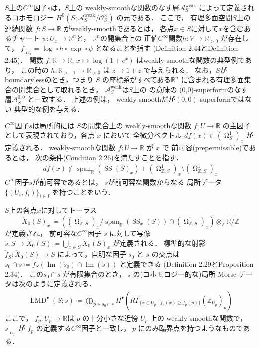 \documentclass[uplatex,dvipdfmx,12pt]{jsarticle}
\numberwithin{equation}{section}
\theoremstyle{definition}
\newcommand{\deq}{\coloneqq}
\newcommand{\opn}[1]{\operatorname{#1}}
\DeclareMathOperator{\tform}{\Omega}
\begin{document}
$S$上の$C^{\infty}$因子$s$は，$S$上の
weakly-smoothな関数のなす層$\mathcal{A}^{\mathrm{weak}}_S$
によって定義されるコホモロジー
$H^{0}(S;\mathcal{A}^{\mathrm{weak}}_S/\mathcal{O}^{\times}_S)$
の元である．
ここで，
有理多面空間$S$上の連続関数
$f\colon S\to \mathbb{R}$
がweakly-smoothであるとは，
各点$x\in S$に対して$x$を含むあるチャート
$\psi \colon U_x\to \underline{\mathbb{R}}^{n}$と，
$\mathbb{R}^{n}$の開集合上の
正値$C^{\infty}$関数$h\colon V\to \mathbb{R}_{>0}$
が存在して，
$f|_{U_x}=\opn{log}\circ h\circ \opn{exp}\circ \psi$
となることを指す
(Definition 2.44とDefinition 2.45)．
関数
$
f\colon \underline{\mathbb{R}}\to \mathbb{R}
$;
$
x\mapsto \opn{log}(1+e^{x})
$
はweakly-smoothな関数の典型例であり，
この時の
$
h \colon \mathbb{R}_{>-1} \to \mathbb{R}_{>0}
$
は
$
z \mapsto 1+z
$
で与えられる．
なお，$S$がboundarylessのとき，つまり
$S$ の座標系がすべてある$\mathbb{R}^{n}$ 
に含まれる有理多面集合の開集合として取れるとき，
$\mathcal{A}^{\mathrm{weak}}_S$は$S$上の
\cite{MR3903579}の意味の
(0,0)-superformのなす
層$\mathcal{A}^{0,0}_S$
と一致する．
上述の例は，
weakly-smoothだが$(0,0)$-superformではない
典型的な例を与える．

$C^{\infty}$因子$s$は局所的には
$S$の開集合上の 
weakly-smoothな関数 $f\colon U\to \mathbb{R}$
の主因子として表現されており，各点 $x$ において
全微分ベクトル $df(x)\in(\tform_{S}^{1})_x$ 
が定義される．
weakly-smoothな関数
$f\colon U \to \mathbb{R}$ が $x$ で
前可容(prepermissible)であるとは，
次の条件(Condition 2.26)を満たすことを指す．
\begin{align}
df(x)\notin\opn{span}_{\mathbb{R}}(\opn{SS}(S)_x)+
(\tform_{\mathbb{Z},S}^{1})_x 
\setminus (\tform_{\mathbb{Z},S}^{1})_x
\end{align}
$C^{\infty}$因子$s$が前可容であるとは，
$s$が前可容な関数からなる
局所データ$\{(U_i,f_i)\}_{i\in I}$
を持つことをいう．

$S$上の各点$x$に対してトーラス
\begin{equation}
\check{X}_0(S)_x\deq ((\tform^{1}_{\mathbb{Z},S})_x/
\opn{span}_{\mathbb{R}}(\opn{SS}_x(S))\cap 
(\tform^{1}_{\mathbb{Z},S})_x)\otimes_{\mathbb{Z}}
\mathbb{R}/\mathbb{Z}
\end{equation}
が定義され，
前可容な$C^{\infty}$因子 $s$ に対して写像
$\check{s}\colon S\to \check{X}_0(S)\deq 
\bigcup_{x\in S} \check{X}_0(S)_x$ が定義される． 
標準的な射影 $\check{f}_{S}\colon \check{X}_0(S)\to S$
によって，自明な因子 $s_0$ と $s$ の交点は
$s_0\cap s\deq \check{f}_{S}(\opn{Im}(\check{s}_0)\cap 
\opn{Im}(\check{s}))$ と定義できる
(Definition 2.29とProposition 2.34)．
この$s_0\cap s$ が有限集合のとき，
$s$ の(コホモロジー的な)局所 Morse データは次のように定義される．
\begin{align} \label{equation-local-morse-data}
\opn{LMD}^{\bullet}(S;s)\deq 
\bigoplus_{p\in s_0\cap s} 
H^{\bullet}(R\Gamma_{\{x\in U_p\mid f_p(x)\geq f_p(p)\}}(\mathbb{Z}_{U_p})_p)
\end{align}
ここで，
$f_p\colon U_p\to \mathbb{R}$は
$p$ の十分小さな近傍 $U_p$ 上の weakly-smoothな関数で，
$s|_{U_p}$ が $f_p$ の定義する$C^{\infty}$因子と一致し，
$p$ にのみ臨界点を持つようなものである．
\end{document}
